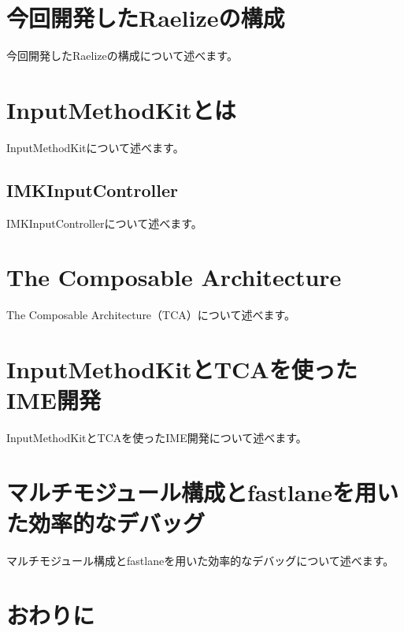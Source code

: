 \documentclass[uplatex,a4j,12pt]{jsarticle}
\begin{document}

\section{今回開発したRaelizeの構成}\label{sec:constract}
今回開発したRaelizeの構成について述べます。

\section{InputMethodKitとは}\label{sec:abount_inputmethodkit}
InputMethodKitについて述べます。

\subsection{IMKInputController}\label{sec:imkInput_controller}
IMKInputControllerについて述べます。

\section{The Composable Architecture}\label{sec:the_composable_architecture}
The Composable Architecture（TCA）について述べます。

\section{InputMethodKitとTCAを使ったIME開発}\label{sec:use_imk_and_tca}
InputMethodKitとTCAを使ったIME開発について述べます。

\section{マルチモジュール構成とfastlaneを用いた効率的なデバッグ}\label{sec:multi_module_and_fastlane}
マルチモジュール構成とfastlaneを用いた効率的なデバッグについて述べます。

\section{おわりに}\label{sec:conclusion}

 
 
\end{document}
